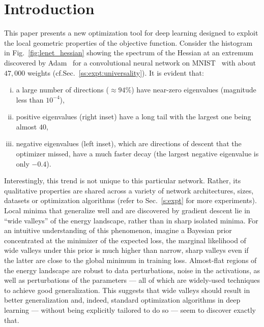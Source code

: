 \documentclass[10pt]{article}
\newcommand{\todo}[1]{{\color{gray}#1}\marginpar{\tiny\noindent{\raggedright{\color{blue}[TODO]}}}}
\begin{document}
\section{Introduction}
\label{s:intro}
This paper presents a new optimization tool for deep learning designed to exploit the local geometric properties of the objective function. Consider the histogram in Fig.~\ref{fig:lenet_hessian} showing the spectrum of the Hessian at an extremum discovered by Adam~\citep{kingma2014adam} for a convolutional neural network on MNIST~\citep{lecun1998gradient} with about $47,000$ weights (cf.\@ Sec.~\ref{ss:expt:universality}). It is evident that:
\begin{enumerate}[(i)]
\item a large number of directions ($\approx 94\%$) have near-zero eigenvalues (magnitude less than $10^{-4}$),
\item positive eigenvalues (right inset) have a long tail with the largest one being almost $40$,
\item negative eigenvalues (left inset), which are directions of descent that the optimizer missed, have a much faster decay (the largest negative eigenvalue is only $-0.4$).
\end{enumerate}
Interestingly, this trend is not unique to this particular network. Rather, its qualitative properties are shared across a variety of network architectures, sizes, datasets or optimization algorithms (refer to Sec.~\ref{s:expt} for more experiments). Local minima that generalize well and are discovered by gradient descent lie in ``wide valleys'' of the energy landscape, rather than in sharp isolated minima. \todo{For an intuitive understanding of this phenomenon, imagine a Bayesian prior concentrated at the minimizer of the expected loss, the marginal likelihood of wide valleys under this prior is much higher than narrow, sharp valleys even if the latter are close to the global minimum in training loss.} Almost-flat regions of the energy landscape are robust to data perturbations, noise in the activations, as well as perturbations of the parameters --- all of which are widely-used techniques to achieve good generalization. This suggests that wide valleys should result in better generalization and, indeed, standard optimization algorithms in deep learning --- without being explicitly tailored to do so --- seem to discover exactly that.
\end{document}

